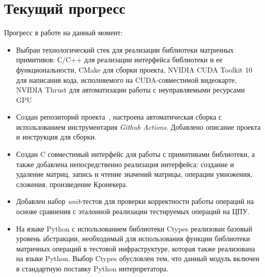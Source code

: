 \section{Текущий прогресс}

Прогресс в работе на данный момент:

\begin{itemize}
    \item Выбран технологический стек для реализации библиотеки матричных примитивов: С/C++ для реализации интерфейса библиотеки и ее функциональности, CMake для сборки проекта, NVIDIA CUDA Toolkit 10 для написания кода, исполняемого на CUDA-совместимой видеокарте, NVIDIA Thrust для автоматизации работы с неуправляемыми ресурсами GPU
    \item Создан репозиторий проекта~\cite{net:cubool_project}, настроена автоматическая сборка с использованием инструментария \textit{Github Actions}. Добавлено описание проекта и инструкция для сборки.
    \item Создан C совместимый интерфейс для работы с примитивами библиотеки, а также добавлена непосредственно реализация интерфейса: создание и удаление матриц, запись и чтение значений матрицы, операции умножения, сложения, произведение Кронекера.
    \item Добавлен набор \textit{unit}-тестов для проверки корректности работы операций на основе сравнения с эталонной реализации тестируемых операций на ЦПУ.
    \item На языке Python с использованием библиотеки Ctypes реализован базовый уровень абстракции, необходимый для использования функции библиотеки матричных операций в тестовой инфраструктуре, которая также реализована на языке Python. Выбор Ctypes обусловлен тем, что данный модуль включен в стандартную поставку Python интерпретатора.
\end{itemize}